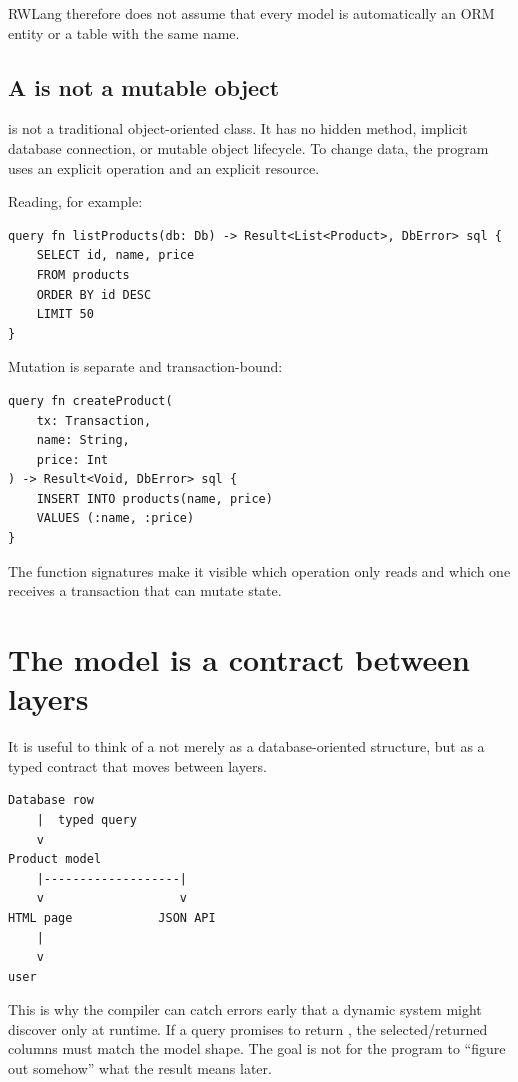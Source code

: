 RWLang therefore does not assume that every model is automatically an ORM entity or a table with the same name.

\subsection*{A  is not a mutable object}

 is not a traditional object-oriented class. It has no hidden  method, implicit database connection, or mutable object lifecycle. To change data, the program uses an explicit operation and an explicit resource.

Reading, for example:

\begin{lstlisting}[language=RWLang]
query fn listProducts(db: Db) -> Result<List<Product>, DbError> sql {
    SELECT id, name, price
    FROM products
    ORDER BY id DESC
    LIMIT 50
}
\end{lstlisting}

Mutation is separate and transaction-bound:

\begin{lstlisting}[language=RWLang]
query fn createProduct(
    tx: Transaction,
    name: String,
    price: Int
) -> Result<Void, DbError> sql {
    INSERT INTO products(name, price)
    VALUES (:name, :price)
}
\end{lstlisting}

The function signatures make it visible which operation only reads and which one receives a transaction that can mutate state.

\section{The model is a contract between layers}

It is useful to think of a  not merely as a database-oriented structure, but as a typed contract that moves between layers.

\begin{lstlisting}
Database row
    |  typed query
    v
Product model
    |-------------------|
    v                   v
HTML page            JSON API
    |
    v
user
\end{lstlisting}

This is why the compiler can catch errors early that a dynamic system might discover only at runtime. If a query promises to return , the selected/returned columns must match the model shape. The goal is not for the program to ``figure out somehow'' what the result means later.

